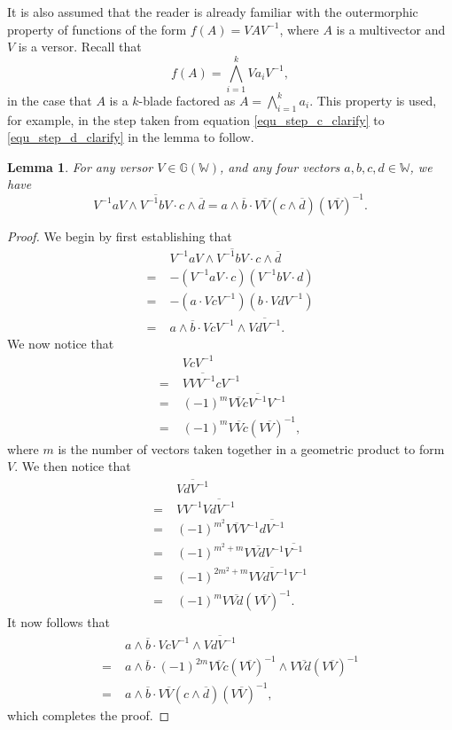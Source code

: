 \documentclass{birkjour}
\newtheorem{lem}[thm]{Lemma}
\theoremstyle{definition}
\theoremstyle{remark}
\numberwithin{equation}{section}
\newcommand{\G}{\mathbb{G}}
\newcommand{\W}{\mathbb{W}}
\begin{document}
It is also assumed that the reader is already familiar with the outermorphic
property of functions of the form $f(A)=VAV^{-1}$, where $A$ is
a multivector and $V$ is a versor.  Recall that
\begin{equation}
f(A) = \bigwedge_{i=1}^k Va_iV^{-1},
\end{equation}
in the case that $A$ is a $k$-blade factored as $A=\bigwedge_{i=1}^k a_i$.
This property is used, for example, in the step taken from equation \eqref{equ_step_c_clarify}
to \eqref{equ_step_d_clarify} in the lemma to follow.
\begin{lem}\label{lma_versor_transfer}
For any versor $V\in\G(\W)$, and any four vectors $a,b,c,d\in\W$, we have
\begin{equation}
V^{-1}aV\wedge\overline{V^{-1}bV}\cdot c\wedge\overline{d} =
a\wedge\overline{b}\cdot V\overline{V}(c\wedge\overline{d})(V\overline{V})^{-1}.
\end{equation}
\end{lem}
\begin{proof}
We begin by first establishing that
\begin{align}
 & V^{-1}aV\wedge\overline{V^{-1}bV}\cdot c\wedge\overline{d} \\
=\;& -(V^{-1}aV\cdot c)(V^{-1}bV\cdot d)\label{equ_step_a_clarify} \\
=\;& -(a\cdot VcV^{-1})(b\cdot VdV^{-1})\label{equ_step_b_clarify} \\
=\;& a\wedge\overline{b}\cdot VcV^{-1}\wedge\overline{VdV^{-1}}.
\end{align}
We now notice that
\begin{align}
& VcV^{-1} \\
=\;& V\overline{VV^{-1}}cV^{-1} \\
=\;& (-1)^m V\overline{V}c\overline{V^{-1}}V^{-1} \\
=\;& (-1)^m V\overline{V}c(V\overline{V})^{-1},
\end{align}
where $m$ is the number of vectors taken together in a geometric
product to form $V$.  We then notice that
\begin{align}
& \overline{VdV^{-1}} \\
=\;& VV^{-1}\overline{VdV^{-1}} \\
=\;& (-1)^{m^2}V\overline{V}V^{-1}\overline{dV^{-1}} \\
=\;&(-1)^{m^2+m}V\overline{Vd}V^{-1}\overline{V^{-1}} \\
=\;&(-1)^{2m^2+m}V\overline{VdV^{-1}}V^{-1} \\
=\;&(-1)^mV\overline{Vd}(V\overline{V})^{-1}.
\end{align}
It now follows that
\begin{align}
 & a\wedge\overline{b}\cdot VcV^{-1}\wedge\overline{VdV^{-1}} \\
=\;& a\wedge\overline{b}\cdot (-1)^{2m}V\overline{V}c(V\overline{V})^{-1}\wedge V\overline{Vd}(V\overline{V})^{-1}\label{equ_step_c_clarify} \\
=\;& a\wedge\overline{b}\cdot V\overline{V}(c\wedge\overline{d})(V\overline{V})^{-1},\label{equ_step_d_clarify}
\end{align}
which completes the proof.
\end{proof}
\end{document}
